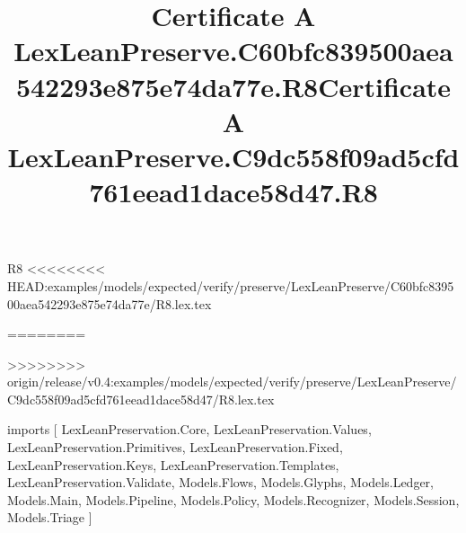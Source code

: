 \begin{lexlean}{R8}
<<<<<<<< HEAD:examples/models/expected/verify/preserve/LexLeanPreserve/C60bfc839500aea542293e875e74da77e/R8.lex.tex
\title{Certificate A LexLeanPreserve.C60bfc839500aea542293e875e74da77e.R8}
========
\title{Certificate A LexLeanPreserve.C9dc558f09ad5cfd761eead1dace58d47.R8}
>>>>>>>> origin/release/v0.4:examples/models/expected/verify/preserve/LexLeanPreserve/C9dc558f09ad5cfd761eead1dace58d47/R8.lex.tex
\begin{coremodule}
imports [
  LexLeanPreservation.Core,
  LexLeanPreservation.Values,
  LexLeanPreservation.Primitives,
  LexLeanPreservation.Fixed,
  LexLeanPreservation.Keys,
  LexLeanPreservation.Templates,
  LexLeanPreservation.Validate,
  Models.Flows,
  Models.Glyphs,
  Models.Ledger,
  Models.Main,
  Models.Pipeline,
  Models.Policy,
  Models.Recognizer,
  Models.Session,
  Models.Triage
]


\end{coremodule}
\end{lexlean}
